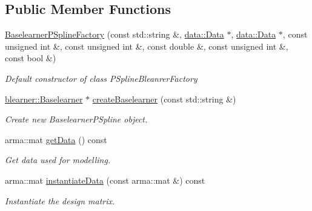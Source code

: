 \subsection*{Public Member Functions}
\begin{DoxyCompactItemize}
\item 
\hyperlink{classblearnerfactory_1_1_baselearner_p_spline_factory_a295bad8fb9554cb45a56c8b6c5e8e047}{Baselearner\+P\+Spline\+Factory} (const std\+::string \&, \hyperlink{classdata_1_1_data}{data\+::\+Data} $\ast$, \hyperlink{classdata_1_1_data}{data\+::\+Data} $\ast$, const unsigned int \&, const unsigned int \&, const double \&, const unsigned int \&, const bool \&)
\begin{DoxyCompactList}\small\item\em Default constructor of class {\ttfamily P\+Spline\+Bleanrer\+Factory} \end{DoxyCompactList}\item 
\hyperlink{classblearner_1_1_baselearner}{blearner\+::\+Baselearner} $\ast$ \hyperlink{classblearnerfactory_1_1_baselearner_p_spline_factory_a3f47f46766e8e50eafe824bd97f7fc44}{create\+Baselearner} (const std\+::string \&)
\begin{DoxyCompactList}\small\item\em Create new {\ttfamily Baselearner\+P\+Spline} object. \end{DoxyCompactList}\item 
arma\+::mat \hyperlink{classblearnerfactory_1_1_baselearner_p_spline_factory_a542e3f962314ea7fe46cfe8eed4c4da7}{get\+Data} () const
\begin{DoxyCompactList}\small\item\em Get data used for modelling. \end{DoxyCompactList}\item 
arma\+::mat \hyperlink{classblearnerfactory_1_1_baselearner_p_spline_factory_aeefb27ef79b2a95b2943a22d0e6368e2}{instantiate\+Data} (const arma\+::mat \&) const
\begin{DoxyCompactList}\small\item\em Instantiate the design matrix. \end{DoxyCompactList}\end{DoxyCompactItemize}
